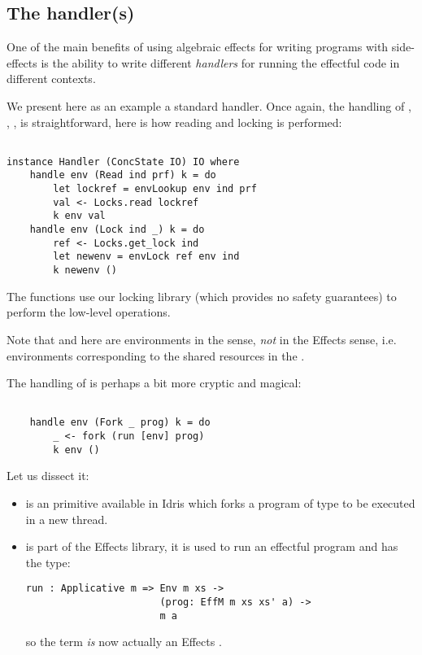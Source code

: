 \subsection{The handler(s)}

One of the main benefits of using algebraic effects for writing programs with
side-effects is the ability to write different \emph{handlers} for running the
effectful code in different contexts.

We present here as an example a standard  handler. Once again, the
handling of , , ,  is
straightforward, here is how reading and locking is performed:

\begin{BVerbatim}

instance Handler (ConcState IO) IO where
    handle env (Read ind prf) k = do
        let lockref = envLookup env ind prf
        val <- Locks.read lockref
        k env val
    handle env (Lock ind _) k = do
        ref <- Locks.get_lock ind
        let newenv = envLock ref env ind
        k newenv ()

\end{BVerbatim}

The  functions use our locking library (which provides no safety
guarantees) to perform the low-level operations.

Note that  and  here are environments in the
 sense, \emph{not} in the Effects sense, i.e. environments
corresponding to the shared resources in the .

The handling of  is perhaps a bit more cryptic and magical:

\begin{BVerbatim}

    handle env (Fork _ prog) k = do
        _ <- fork (run [env] prog)
        k env ()

\end{BVerbatim}

Let us dissect it:

\begin{itemize}
    \item {} is an  primitive available in Idris which forks
        a program of type  to be executed in a new thread.
    \item {} is part of the Effects library, it is used to run an
    effectful program and has the type:
    \begin{Verbatim}
run : Applicative m => Env m xs ->
                       (prog: EffM m xs xs' a) ->
                       m a
    \end{Verbatim}
    so the term \code{[env]} \emph{is} now actually an Effects .
\end{itemize}

